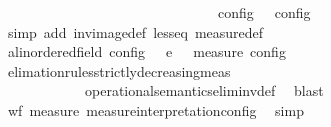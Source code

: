 \begin{isabellebody}
\ \ \ \ \ \ \ \ \ \ \ \ \ \ \ \ \ \ \ \ \ \ \ \ \ \ \ \ \ \ \ {\isasymmu}\isactrlsub c\isactrlsub o\isactrlsub n\isactrlsub f\isactrlsub i\isactrlsub g\ {\isasymS}\ {\isacharless}\ {\isasymmu}\isactrlsub c\isactrlsub o\isactrlsub n\isactrlsub f\isactrlsub i\isactrlsub g\ {\isasymS}\isanewline
\ \ \ \ \ \ \isamarkupfalse%
\ {\isacharparenleft}simp\ add{\isacharcolon}\ inv{\isacharunderscore}image{\isacharunderscore}def\ less{\isacharunderscore}eq\ measure{\isacharunderscore}def{\isacharparenright}\isanewline
\ \ \ \ \isamarkupfalse%
\ {\isacartoucheopen}{\isacharbraceleft}{\isacharparenleft}{\isacharparenleft}{\isasymS}a{\isacharcolon}{\isacharcolon}linordered{\isacharunderscore}field\ config{\isacharparenright}{\isacharcomma}\ {\isasymS}\ {\isasymS}\ {\isasymhookrightarrow}\isactrlsub e\isactrlsup {\isasymleftarrow}\ {\isasymS}\ {\isasymsubseteq}\ {\isacharparenleft}measure\ {\isasymmu}\isactrlsub c\isactrlsub o\isactrlsub n\isactrlsub f\isactrlsub i\isactrlsub g{\isacharparenright}{\isacartoucheclose}\isanewline
\ \ \ \ \ \ \isamarkupfalse%
\ elimation{\isacharunderscore}rules{\isacharunderscore}strictly{\isacharunderscore}decreasing{\isacharunderscore}meas{\isacharprime}\isanewline
\ \ \ \ \ \ \ \ \ \ \ \ operational{\isacharunderscore}semantics{\isacharunderscore}elim{\isacharunderscore}inv{\isacharunderscore}def\ \isamarkupfalse%
\ blast\isanewline
\ \ \isamarkupfalse%
\isanewline
\ \ \ \ \isamarkupfalse%
\ {\isacartoucheopen}wf\ {\isacharparenleft}measure\ measure{\isacharunderscore}interpretation{\isacharunderscore}config{\isacharparenright}{\isacartoucheclose}\ \isamarkupfalse%
\ simp\isanewline
\ \ \isamarkupfalse%
\isanewline
{}\isamarkupfalse%
%
\endisatagproof
{\isafoldproof}%
%
\isadelimproof
\isanewline
%
\endisadelimproof
%
\isadelimtheory
\isanewline
%
\endisadelimtheory
%
\isatagtheory
{}\isamarkupfalse%
%
\endisatagtheory
{\isafoldtheory}%
%
\isadelimtheory
%
\endisadelimtheory
%
\end{isabellebody}%
\endinput
